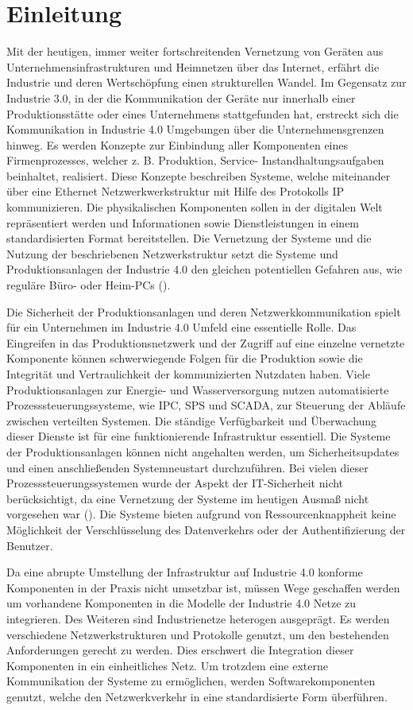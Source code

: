 \chapter{Einleitung}
Mit der heutigen, immer weiter fortschreitenden Vernetzung von Geräten aus Unternehmensinfrastrukturen und Heimnetzen über das Internet, erfährt die Industrie und deren Wertschöpfung einen strukturellen Wandel. Im Gegensatz zur Industrie 3.0, in der die Kommunikation der Geräte nur innerhalb einer Produktionsstätte oder eines Unternehmens stattgefunden hat, erstreckt sich die Kommunikation in Industrie 4.0 Umgebungen über die Unternehmensgrenzen hinweg. Es werden Konzepte zur Einbindung aller Komponenten eines Firmenprozesses, welcher z. B. Produktion, Service- Instandhaltungsaufgaben beinhaltet, realisiert. Diese Konzepte beschreiben Systeme, welche miteinander über eine Ethernet Netzwerkwerkstruktur mit Hilfe des Protokolls \ac{IP} kommunizieren. Die physikalischen Komponenten sollen in der digitalen Welt repräsentiert werden und Informationen sowie Dienstleistungen in einem standardisierten Format bereitstellen. Die Vernetzung der Systeme und die Nutzung der beschriebenen Netzwerkstruktur setzt die Systeme und Produktionsanlagen der Industrie 4.0 den gleichen potentiellen Gefahren aus, wie reguläre Büro- oder Heim-PCs (\cite{Halang2016}).

Die Sicherheit der Produktionsanlagen und deren Netzwerkkommunikation spielt für ein Unternehmen im Industrie 4.0 Umfeld eine essentielle Rolle. Das Eingreifen in das Produktionsnetzwerk und der Zugriff auf eine einzelne vernetzte Komponente können schwerwiegende Folgen für die Produktion sowie die Integrität und Vertraulichkeit der kommunizierten Nutzdaten haben. Viele Produktionsanlagen zur Energie- und Wasserversorgung nutzen automatisierte Prozesssteuerungssysteme, wie \ac{IPC}, \ac{SPS} und \ac{SCADA}, zur Steuerung der Abläufe zwischen verteilten Systemen. Die ständige Verfügbarkeit und Überwachung dieser Dienste ist für eine funktionierende Infrastruktur essentiell. Die Systeme der Produktionsanlagen können nicht angehalten werden, um Sicherheitsupdates und einen anschließenden Systemneustart durchzuführen. Bei vielen dieser Prozesssteuerungssystemen wurde der Aspekt der IT-Sicherheit nicht berücksichtigt, da eine Vernetzung der Systeme im heutigen Ausmaß nicht vorgesehen war (\cite{Schleupner2016}). Die Systeme bieten aufgrund von Ressourcenknappheit keine Möglichkeit der Verschlüsselung des Datenverkehrs oder der Authentifizierung der Benutzer.

Da eine abrupte Umstellung der Infrastruktur auf Industrie 4.0 konforme Komponenten in der Praxis nicht umsetzbar ist, müssen Wege geschaffen werden um vorhandene Komponenten in die Modelle der Industrie 4.0 Netze zu integrieren. Des Weiteren sind Industrienetze heterogen ausgeprägt. Es werden verschiedene Netzwerkstrukturen und Protokolle genutzt, um den bestehenden Anforderungen gerecht zu werden. Dies erschwert die Integration dieser Komponenten in ein einheitliches Netz. Um trotzdem eine externe Kommunikation der Systeme zu ermöglichen, werden Softwarekomponenten genutzt, welche den Netzwerkverkehr in eine standardisierte Form überführen.

